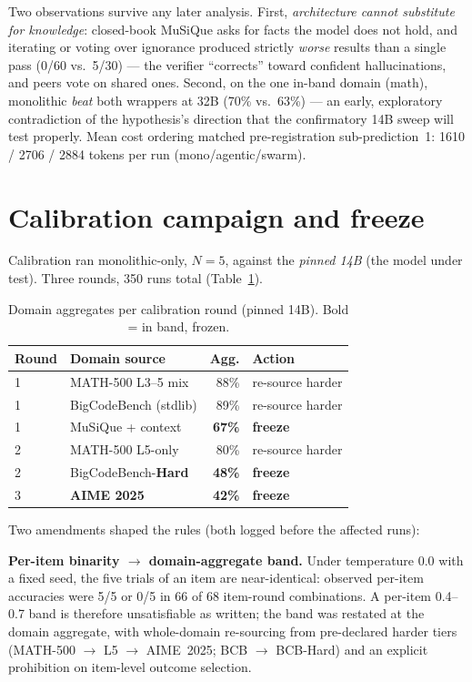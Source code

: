 \documentclass[sigconf,nonacm]{acmart}
\begin{document}
Two observations survive any later analysis. First, \emph{architecture cannot
substitute for knowledge}: closed-book MuSiQue asks for facts the model does not hold,
and iterating or voting over ignorance produced strictly \emph{worse} results than a
single pass (0/60 vs.\ 5/30) --- the verifier ``corrects'' toward confident
hallucinations, and peers vote on shared ones. Second, on the one in-band domain
(math), monolithic \emph{beat} both wrappers at 32B (70\% vs.\ 63\%) --- an early,
exploratory contradiction of the hypothesis's direction that the confirmatory 14B sweep
will test properly. Mean cost ordering matched pre-registration sub-prediction~1:
1610 / 2706 / 2884 tokens per run (mono/agentic/swarm).

\section{Calibration campaign and freeze}
Calibration ran monolithic-only, $N{=}5$, against the \emph{pinned 14B} (the model
under test). Three rounds, 350 runs total (Table~\ref{tab:calib}).

\begin{table}[h]
\caption{Domain aggregates per calibration round (pinned 14B). Bold = in band, frozen.}
\label{tab:calib}
\begin{tabular}{llrl}
\toprule
Round & Domain source & Agg. & Action\\
\midrule
1 & MATH-500 L3--5 mix        & 88\% & re-source harder\\
1 & BigCodeBench (stdlib)     & 89\% & re-source harder\\
1 & MuSiQue + context         & \textbf{67\%} & \textbf{freeze}\\
2 & MATH-500 L5-only          & 80\% & re-source harder\\
2 & BigCodeBench-\textbf{Hard} & \textbf{48\%} & \textbf{freeze}\\
3 & \textbf{AIME 2025}        & \textbf{42\%} & \textbf{freeze}\\
\bottomrule
\end{tabular}
\end{table}

Two amendments shaped the rules (both logged before the affected runs):

\textbf{Per-item binarity $\rightarrow$ domain-aggregate band.} Under temperature 0.0
with a fixed seed, the five trials of an item are near-identical: observed per-item
accuracies were 5/5 or 0/5 in 66 of 68 item-round combinations. A per-item 0.4--0.7
band is therefore unsatisfiable as written; the band was restated at the domain
aggregate, with whole-domain re-sourcing from pre-declared harder tiers
(MATH-500 $\rightarrow$ L5 $\rightarrow$ AIME~2025; BCB $\rightarrow$ BCB-Hard) and an
explicit prohibition on item-level outcome selection.
\end{document}
